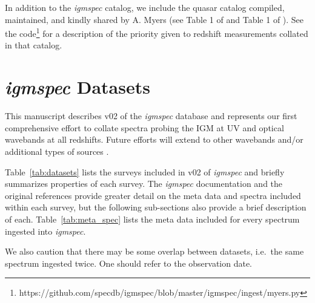 \documentclass[12pt]{elsarticle}
\begin{document}
In addition to the {\it igmspec} catalog, we include the quasar
catalog  compiled, maintained, and kindly shared by A. Myers 
(see Table 1 of \cite{peters+15}
and Table 1 of \cite{richards+15}). 
See the code\footnote{https://github.com/specdb/igmspec/blob/master/igmspec/ingest/myers.py} 
for a description of the priority given to 
redshift measurements collated in that catalog.


\section{{\it igmspec} Datasets}
\label{sec:datasets}

This manuscript describes v02 of the {\it igmspec}
database and represents our first comprehensive effort to collate
spectra probing the IGM at UV and optical wavebands at all
redshifts.  Future efforts will extend to other wavebands and/or
additional types of sources 
\citep[e.g. star-forming galaxies;][]{rpk+10}.

Table~\ref{tab:datasets} lists the surveys included in
v02 of {\it igmspec} and briefly summarizes properties
of each survey.  The {\it igmspec} documentation and 
the original references provide greater detail on the meta data
and spectra included within each survey, but the following
sub-sections also provide a brief description of each.
Table~\ref{tab:meta_spec} lists the meta data included
for every spectrum ingested into {\it igmspec}.

We also caution that there may be some overlap between
datasets, i.e.\ the same spectrum ingested twice.  One
should refer to the observation date. 


\end{document}
